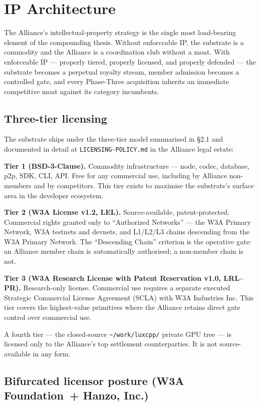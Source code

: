 \section{IP Architecture}

The Alliance's intellectual-property strategy is the single most
load-bearing element of the compounding thesis. Without enforceable IP,
the substrate is a commodity and the Alliance is a coordination club
without a moat. With enforceable IP --- properly tiered, properly
licensed, and properly defended --- the substrate becomes a perpetual
royalty stream, member admission becomes a controlled gate, and every
Phase-Three acquisition inherits an immediate competitive moat against
its category incumbents.

\subsection{Three-tier licensing}

The substrate ships under the three-tier model summarised in \S 2.1 and
documented in detail at \texttt{LICENSING-POLICY.md} in the Alliance
legal estate:

\textbf{Tier 1 (BSD-3-Clause).} Commodity infrastructure --- node,
codec, database, p2p, SDK, CLI, API. Free for any commercial use,
including by Alliance non-members and by competitors. This tier exists
to maximise the substrate's surface area in the developer ecosystem.

\textbf{Tier 2 (W3A License v1.2, LEL).} Source-available,
patent-protected. Commercial rights granted only to ``Authorized
Networks'' --- the W3A Primary Network, W3A testnets and devnets, and
L1/L2/L3 chains descending from the W3A Primary Network. The
``Descending Chain'' criterion is the operative gate: an Alliance
member chain is automatically authorised; a non-member chain is not.

\textbf{Tier 3 (W3A Research License with Patent Reservation v1.0,
LRL--PR).} Research-only license. Commercial use requires a separate
executed Strategic Commercial License Agreement (SCLA) with W3A
Industries Inc. This tier covers the highest-value primitives where the
Alliance retains direct gate control over commercial use.

A fourth tier --- the closed-source \texttt{\textasciitilde/work/luxcpp/}
private GPU tree --- is licensed only to the Alliance's top settlement
counterparties. It is not source-available in any form.

\subsection{Bifurcated licensor posture (W3A Foundation\ + Hanzo, Inc.)}

